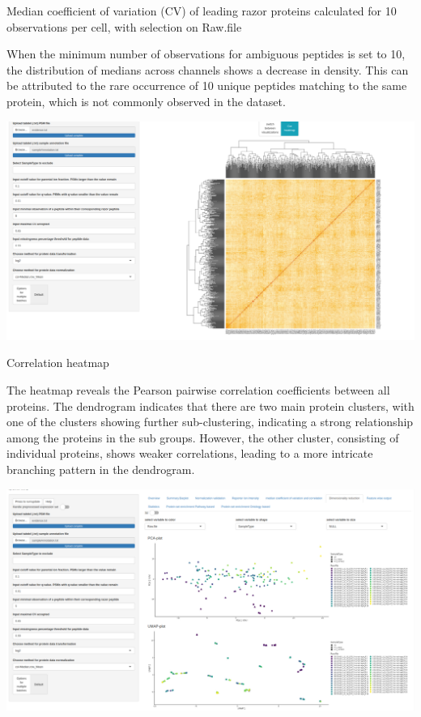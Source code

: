 \documentclass[
  11pt,
]{article}
\let\origfigure\figure
\begin{document}
\caption{Median coefficient of variation (CV) of leading razor proteins calculated for 10 observations per cell, with selection on Raw.file}\label{fig:ui_cv_rawfile_nobs10}
 \endfigure\egroup

When the minimum number of observations for ambiguous peptides is set to
10, the distribution of medians across channels shows a decrease in
density. This can be attributed to the rare occurrence of 10 unique
peptides matching to the same protein, which is not commonly observed in
the dataset.

\newpage
\bgroup  \origfigure[H] 

{\centering \includegraphics[width=1\linewidth]{screenshots/heatmap} 

}

\caption{Correlation heatmap}\label{fig:ui_heatmap}
 \endfigure\egroup

The heatmap reveals the Pearson pairwise correlation coefficients
between all proteins. The dendrogram indicates that there are two main
protein clusters, with one of the clusters showing further
sub-clustering, indicating a strong relationship among the proteins in
the sub groups. However, the other cluster, consisting of individual
proteins, shows weaker correlations, leading to a more intricate
branching pattern in the dendrogram.

\newpage
\bgroup  \origfigure[H] 

{\centering \includegraphics[width=1\linewidth]{screenshots/dim_red_default} 

}
\end{document}
